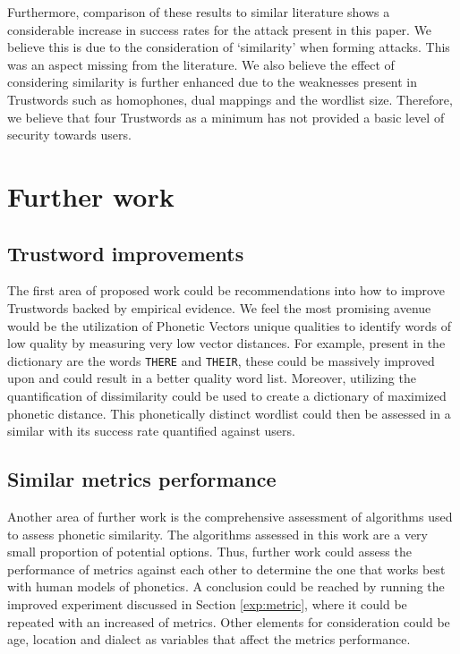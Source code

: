 Furthermore, comparison of these results to similar literature shows a considerable increase in success rates for the attack present in this paper. We believe this is due to the consideration of `similarity' when forming attacks. This was an aspect missing from the literature.
We also believe the effect of considering similarity is further enhanced due to the  weaknesses present in Trustwords such as homophones, dual mappings and the wordlist size. Therefore, we believe that four Trustwords as a minimum has not provided a basic level of security towards users.

\section{Further work}

\subsection*{Trustword improvements}
The first area of proposed work could be recommendations into how to improve Trustwords backed by empirical evidence. We feel the most promising avenue would be the utilization of Phonetic Vectors unique qualities to identify words of low quality by measuring very low vector distances. For example, present in the dictionary are the words \verb|THERE| and \verb|THEIR|, these could be massively improved upon and could result in a better quality word list. Moreover, utilizing the quantification of dissimilarity could be used to create a dictionary of maximized phonetic distance. This phonetically distinct wordlist could then be assessed in a similar with its success rate quantified against users.

\subsection*{Similar metrics performance}
Another area of further work is the comprehensive assessment of algorithms used to assess phonetic similarity. The algorithms assessed in this work are a very small proportion of potential options. Thus, further work could assess the performance of metrics against each other to determine the one that works best with human models of phonetics. A conclusion could be reached by running the improved experiment discussed in Section \ref{exp:metric}, where it could be repeated with an increased of metrics. Other elements for consideration could be age, location and dialect as variables that affect the metrics performance. 

